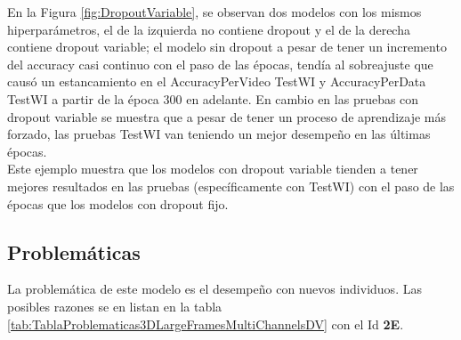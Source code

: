 \begin{onehalfspacing}
En la Figura \ref{fig:DropoutVariable}, se observan dos modelos con los mismos hiperparámetros, el de la izquierda no contiene dropout y el de la derecha contiene dropout variable; el modelo sin dropout a pesar de tener un incremento del accuracy casi continuo con el paso de las épocas, tendía al sobreajuste que causó un estancamiento en el AccuracyPerVideo TestWI y AccuracyPerData TestWI a partir de la época 300 en adelante. En cambio en las pruebas con dropout variable se muestra que a pesar de tener un proceso de aprendizaje más forzado, las pruebas TestWI van teniendo un mejor desempeño en las últimas épocas.\\

Este ejemplo muestra que los modelos con dropout variable tienden a tener mejores resultados en las pruebas (específicamente con TestWI) con el paso de las épocas que los modelos con dropout fijo.\\

\subsection{Problemáticas}
\label{sec:Problematicas3DLargeFramesMultiChannelsDV}

La problemática de este modelo es el desempeño con nuevos individuos. Las posibles razones se en listan en la tabla \ref{tab:TablaProblematicas3DLargeFramesMultiChannelsDV} con el Id \textbf{2E}.\\



\end{onehalfspacing}
